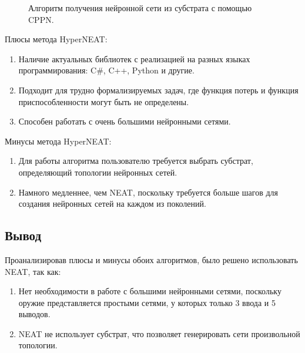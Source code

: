 \begin{figure}[ht]
    \begin{center}

        \caption{
            \label{substrat}
            Алгоритм получения нейронной сети из субстрата с помощью CPPN.}
    \end {center}
\end {figure}


{\parindent0pt Плюсы метода HyperNEAT:}
\begin{enumerate}[--]
    \item Наличие актуальных библиотек с реализацией на разных языках программирования: C\#, C++, Python и другие.
    \item Подходит для трудно формализируемых задач, где функция потерь и функция приспособленности могут быть не определены.
    \item Способен работать с очень большими нейронными сетями.
\end{enumerate}
%
Минусы метода HyperNEAT:
\begin{enumerate}[--]
    \item Для работы алгоритма пользователю требуется выбрать субстрат, определяющий топологии нейронных сетей. 
    \item Намного медленнее, чем NEAT, поскольку требуется больше шагов для создания нейронных сетей на каждом из поколений.
\end{enumerate}


\subsection{Вывод}
Проанализировав плюсы и минусы обоих алгоритмов, было решено использовать NEAT, так как:

\begin{enumerate}[label=\textbullet]
    \item Нет необходимости в работе с большими нейронными сетями, поскольку оружие представляется простыми сетями, у которых только 3 ввода и 5 выводов.
    \item NEAT не использует субстрат, что позволяет генерировать сети произвольной топологии.
\end{enumerate}








